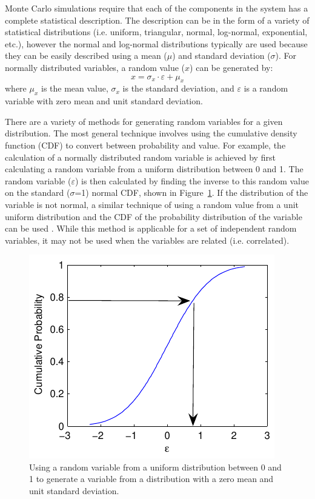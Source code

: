 \documentclass[11pt]{report}
\begin{document}
Monte Carlo simulations require that each of the components in the system has a complete statistical
description.  The description can be in the form of a variety of statistical distributions (i.e.
uniform, triangular, normal, log-normal, exponential, etc.), however the normal and log-normal
distributions typically are used because they can be easily described using a mean ($\mu$) and
standard deviation ($\sigma$).  For normally distributed variables, a random value ($x$) can be
generated by:
\begin{equation}
  x = \sigma_x \cdot \varepsilon + \mu_x
  \label{eq:randVar}
\end{equation}
where $\mu_x$ is the mean value, $\sigma_x$ is the standard deviation, and $\varepsilon$ is a random
variable with zero mean and unit standard deviation.  

There are a variety of methods for generating random variables for a given distribution.  The most
general technique involves using the cumulative density function (CDF) to convert between
probability and value.  For example, the calculation of a normally distributed random variable is
achieved by first calculating a random variable from a uniform distribution between 0 and 1.  The
random variable ($\varepsilon$) is then calculated by finding the inverse to this random value on
the standard ($\sigma$=1) normal CDF, shown in Figure~\ref{fig:rand:variable}.  If the distribution
of the variable is not normal, a similar technique of using a random value from a unit uniform
distribution and the CDF of the probability distribution of the variable can be used
\citep{ang:vol2}.  While this method is applicable for a set of independent random variables, it may
not be used when the variables are related (i.e. correlated).

\begin{figure}[tb]
  \begin{center}
	\includegraphics{figures/rand/variable.pdf}
  \end{center}
  \caption{Using a random variable from a uniform distribution between 0 and 1 to generate a
  variable from a distribution with a zero mean and unit standard deviation.}
  \label{fig:rand:variable}
\end{figure}
\end{document}
